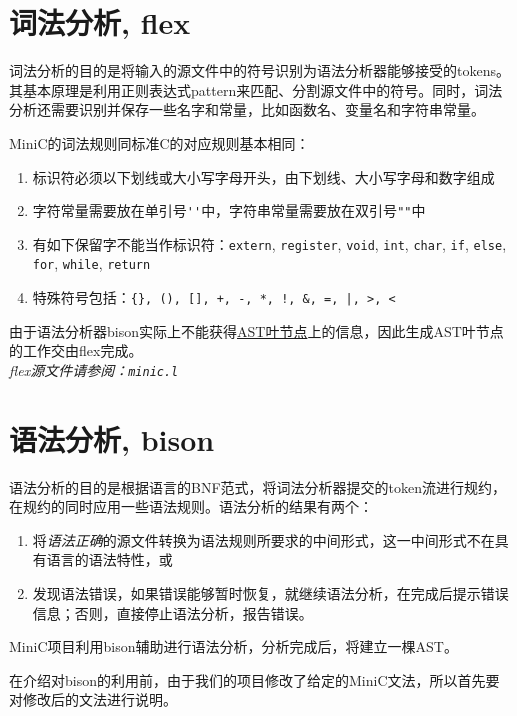 \section{词法分析, flex}
\label{flex}
词法分析的目的是将输入的源文件中的符号识别为语法分析器能够接受的tokens。其基本原理是利用正则表达式pattern来匹配、分割源文件中的符号。同时，词法分析还需要识别并保存一些名字和常量，比如函数名、变量名和字符串常量。

MiniC的词法规则同标准C的对应规则基本相同：
\begin{enumerate}
	\item 标识符必须以下划线或大小写字母开头，由下划线、大小写字母和数字组成
	\item 字符常量需要放在单引号\verb|''|中，字符串常量需要放在双引号\verb|""|中
	\item 有如下保留字不能当作标识符：\verb|extern|, \verb|register|, \verb|void|, \verb|int|, \verb|char|, \verb|if|, \verb|else|, \verb|for|, \verb|while|, \verb|return|
	\item 特殊符号包括：\verb#{}, (), [], +, -, *, !, &, =, |, >, <#
\end{enumerate}
由于语法分析器bison实际上不能获得\hyperref[ASTnode]{AST叶节点}上的信息，因此生成AST叶节点的工作交由flex完成。\\

{\it \anchor flex源文件请参阅：\verb|minic.l|}
\section{语法分析, bison}
\label{bison}
语法分析的目的是根据语言的BNF范式，将词法分析器提交的token流进行规约，在规约的同时应用一些语法规则。语法分析的结果有两个：
\begin{enumerate}
	\item 将\emph{语法正确}的源文件转换为语法规则所要求的中间形式，这一中间形式不在具有语言的语法特性，或
	\item 发现语法错误，如果错误能够暂时恢复，就继续语法分析，在完成后提示错误信息；否则，直接停止语法分析，报告错误。
\end{enumerate}
MiniC项目利用bison辅助进行语法分析，分析完成后，将建立一棵AST。

在介绍对bison的利用前，由于我们的项目修改了给定的MiniC文法，所以首先要对修改后的文法进行说明。
